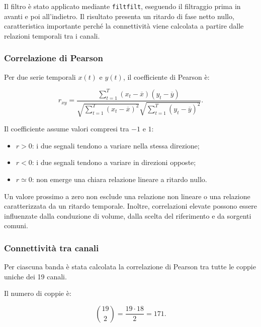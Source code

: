 Il filtro è stato applicato mediante \texttt{filtfilt}, eseguendo il
filtraggio prima in avanti e poi all'indietro. Il risultato presenta
un ritardo di fase netto nullo, caratteristica importante perché la
connettività viene calcolata a partire dalle relazioni temporali tra
i canali.


\subsubsection{Correlazione di Pearson}

Per due serie temporali $x(t)$ e $y(t)$, il coefficiente di Pearson è:

\begin{equation}
	r_{xy}
	=
	\frac{
		\sum_{t=1}^{T}
		\left(x_t-\overline{x}\right)
		\left(y_t-\overline{y}\right)
	}{
		\sqrt{
			\sum_{t=1}^{T}
			\left(x_t-\overline{x}\right)^2
		}
		\sqrt{
			\sum_{t=1}^{T}
			\left(y_t-\overline{y}\right)^2
		}
	}.
\end{equation}

Il coefficiente assume valori compresi tra $-1$ e $1$:

\begin{itemize}
	\item $r>0$: i due segnali tendono a variare nella stessa
	direzione;
	
	\item $r<0$: i due segnali tendono a variare in direzioni
	opposte;
	
	\item $r\simeq0$: non emerge una chiara relazione lineare a
	ritardo nullo.
\end{itemize}

Un valore prossimo a zero non esclude una relazione non lineare o una
relazione caratterizzata da un ritardo temporale. Inoltre, correlazioni
elevate possono essere influenzate dalla conduzione di volume, dalla
scelta del riferimento e da sorgenti comuni.


\subsubsection{Connettività tra canali}

Per ciascuna banda è stata calcolata la correlazione di Pearson tra
tutte le coppie uniche dei 19 canali.

Il numero di coppie è:

\begin{equation}
	\binom{19}{2}
	=
	\frac{19\cdot18}{2}
	=
	171.
\end{equation}

